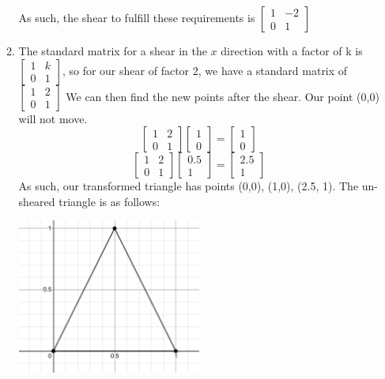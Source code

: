 \documentclass[11pt, letterpaper, twoside]{article}
\begin{document}
\begin{enumerate}
\begin{enumerate}[label=\alph*)]
As such, the shear to fulfill these requirements is \(\boxed{\begin{bmatrix}
1&-2\\
0&1
\end{bmatrix}}\)
\item The standard matrix for a shear in the \(x\) direction with a factor of k is \(\begin{bmatrix}
    1&k\\
    0&1
\end{bmatrix}\), so for our shear of factor 2, we have a standard matrix of \(\begin{bmatrix}
1&2\\
0&1
\end{bmatrix}\)
We can then find the new points after the shear. Our point (0,0) will not move.
\[\begin{bmatrix}
1&2\\
0&1
\end{bmatrix}\begin{bmatrix}
1\\
0
\end{bmatrix}=\begin{bmatrix}
1\\
0
\end{bmatrix}\]
\[\begin{bmatrix}
1&2\\
0&1
\end{bmatrix}\begin{bmatrix}
0.5\\ 
1
\end{bmatrix}=\begin{bmatrix}
2.5\\
1
\end{bmatrix}\]
As such, our transformed triangle has points (0,0), (1,0), (2.5, 1).
The un-sheared triangle is as follows:

\includegraphics[width=0.5\textwidth]{q5a}\par\vspace{1cm}


\end{enumerate}
\end{enumerate}
\end{document}
